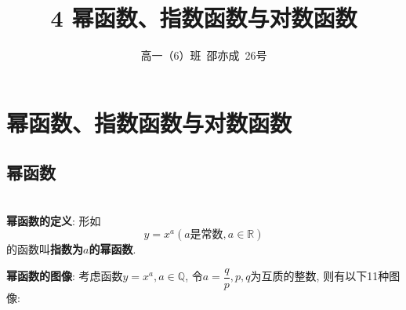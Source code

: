 \documentclass[8pt]{article}
\title{4 幂函数、指数函数与对数函数}
\author{高一（6）班\ 邵亦成\ 26号}
\begin{document}
	\maketitle

	\section{幂函数、指数函数与对数函数}
		\subsection{幂函数}
			~\\

			\textbf{幂函数的定义}: 形如$$y=x^a (a\text{是常数}, a\in \mathbb{R})$$的函数叫\textbf{指数为$a$的幂函数}.

			\textbf{幂函数的图像}: 考虑函数$y=x^a, a\in \mathbb{Q}$, 令$a=\dfrac{q}{p}, p, q$为互质的整数, 则有以下11种图像:
\end{document}
